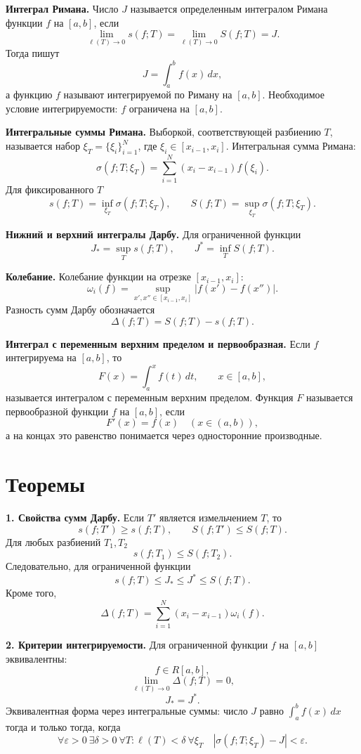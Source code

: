 \documentclass[12pt,a4paper]{article}
\newcommand{\eps}{\varepsilon}
\newcommand{\dd}{\,d}
\newcommand{\mesh}{\ell}
\newcommand{\osc}{\omega}
\begin{document}
\textbf{Интеграл Римана.}
Число \(J\) называется определенным интегралом Римана функции \(f\) на
\([a,b]\), если
\[
  \lim_{\mesh(T)\to0}s(f;T)=
  \lim_{\mesh(T)\to0}S(f;T)=J.
\]
Тогда пишут
\[
  J=\int_a^b f(x)\dd x,
\]
а функцию \(f\) называют интегрируемой по Риману на \([a,b]\). Необходимое
условие интегрируемости: \(f\) ограничена на \([a,b]\).

\textbf{Интегральные суммы Римана.}
Выборкой, соответствующей разбиению \(T\), называется набор
\(\xi_T=\{\xi_i\}_{i=1}^N\), где \(\xi_i\in[x_{i-1},x_i]\). Интегральная сумма
Римана:
\[
  \sigma(f;T;\xi_T)=
  \sum_{i=1}^N (x_i-x_{i-1})f(\xi_i).
\]
Для фиксированного \(T\)
\[
  s(f;T)=\inf_{\xi_T}\sigma(f;T;\xi_T),\qquad
  S(f;T)=\sup_{\xi_T}\sigma(f;T;\xi_T).
\]

\textbf{Нижний и верхний интегралы Дарбу.}
Для ограниченной функции
\[
  J_*=\sup_T s(f;T),\qquad
  J^*=\inf_T S(f;T).
\]

\textbf{Колебание.}
Колебание функции на отрезке \([x_{i-1},x_i]\):
\[
  \osc_i(f)=
  \sup_{x',x''\in[x_{i-1},x_i]}|f(x')-f(x'')|.
\]
Разность сумм Дарбу обозначается
\[
  \Delta(f;T)=S(f;T)-s(f;T).
\]

\textbf{Интеграл с переменным верхним пределом и первообразная.}
Если \(f\) интегрируема на \([a,b]\), то
\[
  F(x)=\int_a^x f(t)\dd t,\qquad x\in[a,b],
\]
называется интегралом с переменным верхним пределом. Функция \(F\) называется
первообразной функции \(f\) на \([a,b]\), если
\[
  F'(x)=f(x)\quad (x\in(a,b)),
\]
а на концах это равенство понимается через односторонние производные.

\section*{Теоремы}

\textbf{1. Свойства сумм Дарбу.}
Если \(T'\) является измельчением \(T\), то
\[
  s(f;T')\ge s(f;T),\qquad S(f;T')\le S(f;T).
\]
Для любых разбиений \(T_1,T_2\)
\[
  s(f;T_1)\le S(f;T_2).
\]
Следовательно, для ограниченной функции
\[
  s(f;T)\le J_*\le J^*\le S(f;T).
\]
Кроме того,
\[
  \Delta(f;T)=\sum_{i=1}^N (x_i-x_{i-1})\osc_i(f).
\]

\textbf{2. Критерии интегрируемости.}
Для ограниченной функции \(f\) на \([a,b]\) эквивалентны:
\[
  f\in R[a,b],
\]
\[
  \lim_{\mesh(T)\to0}\Delta(f;T)=0,
\]
\[
  J_*=J^*.
\]
Эквивалентная форма через интегральные суммы: число \(J\) равно
\(\int_a^b f(x)\dd x\) тогда и только тогда, когда
\[
  \forall\eps>0\ \exists\delta>0\ \forall T:\mesh(T)<\delta\
  \forall\xi_T\quad
  |\sigma(f;T;\xi_T)-J|<\eps.
\]
\end{document}
